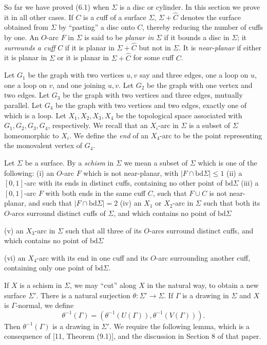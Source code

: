
So far we have proved (6.1) when $\Sigma$ is a disc or cylinder. In this section we prove it in all other cases. If $C$ is a cuff of a surface $\Sigma$, $\Sigma + \hat{C}$ denotes the surface obtained from $\Sigma$ by ``pasting'' a disc onto $C$, thereby reducing the number of cuffs by one. An $O$-arc $F$ in $\Sigma$ is said to be \textit{planar in} $\Sigma$ if it bounds a disc in $\Sigma$; it \textit{surrounds a cuff} $C$ if it is planar in $\Sigma + \hat{C}$ but not in $\Sigma$. It is \textit{near-planar} if either it is planar in $\Sigma$ or it is planar in $\Sigma + \hat{C}$ for some cuff $C$.

Let $G_1$ be the graph with two vertices $u, v$ say and three edges, one a loop on $u$, one a loop on $v$, and one joining $u, v$. Let $G_2$ be the graph with one vertex and two edges. Let $G_3$ be the graph with two vertices and three edges, mutually parallel. Let $G_4$ be the graph with two vertices and two edges, exactly one of which is a loop. Let $X_1, X_2, X_3, X_4$ be the topological space associated with $G_1, G_2, G_3, G_4$, respectively. We recall that an $X_i$-arc in $\Sigma$ is a subset of $\Sigma$ homeomorphic to $X_i$. We define the \textit{end} of an $X_4$-arc to be the point representing the monovalent vertex of $G_4$.

Let $\Sigma$ be a surface. By a \textit{schism} in $\Sigma$ we mean a subset of $\Sigma$ which is one of the following: (i) an $O$-arc $F$ which is not near-planar, with $|F \cap \text{bd} \Sigma| \le 1$ (ii) a $[0, 1]$-arc with its ends in distinct cuffs, containing no other point of $\text{bd} \Sigma$ (iii) a $[0, 1]$-arc $F$ with both ends in the same cuff $C$, such that $F \cup C$ is not near-planar, and such that $|F \cap \text{bd} \Sigma| = 2$ (iv) an $X_1$ or $X_2$-arc in $\Sigma$ such that both its $O$-arcs surround distinct cuffs of $\Sigma$, and which contains no point of $\text{bd} \Sigma$

\hspace*{12pt}(v) an $X_3$-arc in $\Sigma$ such that all three of its $O$-arcs surround distinct cuffs, and which contains no point of $\text{bd} \Sigma$

\hspace*{12pt}(vi) an $X_4$-arc with its end in one cuff and its $O$-arc surrounding another cuff, containing only one point of $\text{bd} \Sigma$.

If $X$ is a schism in $\Sigma$, we may ``cut'' along $X$ in the natural way, to obtain a new surface $\Sigma'$. There is a natural surjection $\theta \colon \Sigma' \to \Sigma$. If $\Gamma$ is a drawing in $\Sigma$ and $X$ is $\Gamma$-normal, we define
\begin{equation*}
\theta^{-1}(\Gamma) = (\theta^{-1}(U(\Gamma)), \theta^{-1}(V(\Gamma))).
\end{equation*}
Then $\theta^{-1}(\Gamma)$ is a drawing in $\Sigma'$. We require the following lemma, which is a consequence of [11, Theorem (9.1)], and the discussion in Section 8 of that paper.

